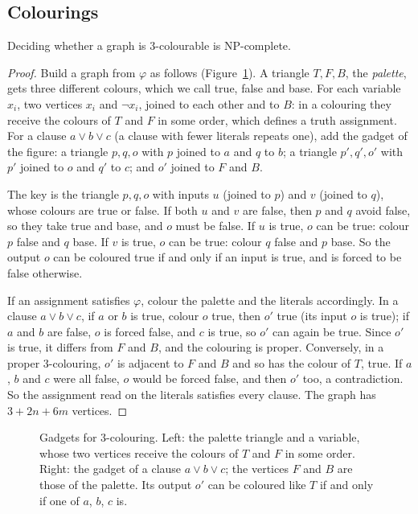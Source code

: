 \subsection*{Colourings}

\begin{theorem}\label{thm:threecol}
Deciding whether a graph is $3$-colourable is NP-complete.
\end{theorem}

\begin{proof}
Build a graph from $\varphi$ as follows (Figure~\ref{fig:colouring}). A triangle $T,F,B$, the \emph{palette}, gets three different colours, which we call true, false and base. For each variable $x_i$, two vertices $x_i$ and $\neg x_i$, joined to each other and to $B$: in a colouring they receive the colours of $T$ and $F$ in some order, which defines a truth assignment. For a clause $a\lor b\lor c$ (a clause with fewer literals repeats one), add the gadget of the figure: a triangle $p,q,o$ with $p$ joined to $a$ and $q$ to $b$; a triangle $p',q',o'$ with $p'$ joined to $o$ and $q'$ to $c$; and $o'$ joined to $F$ and $B$.

The key is the triangle $p,q,o$ with inputs $u$ (joined to $p$) and $v$ (joined to $q$), whose colours are true or false. If both $u$ and $v$ are false, then $p$ and $q$ avoid false, so they take true and base, and $o$ must be false. If $u$ is true, $o$ can be true: colour $p$ false and $q$ base. If $v$ is true, $o$ can be true: colour $q$ false and $p$ base. So the output $o$ can be coloured true if and only if an input is true, and is forced to be false otherwise.

If an assignment satisfies $\varphi$, colour the palette and the literals accordingly. In a clause $a\lor b\lor c$, if $a$ or $b$ is true, colour $o$ true, then $o'$ true (its input $o$ is true); if $a$ and $b$ are false, $o$ is forced false, and $c$ is true, so $o'$ can again be true. Since $o'$ is true, it differs from $F$ and $B$, and the colouring is proper. Conversely, in a proper $3$-colouring, $o'$ is adjacent to $F$ and $B$ and so has the colour of $T$, true. If $a$, $b$ and $c$ were all false, $o$ would be forced false, and then $o'$ too, a contradiction. So the assignment read on the literals satisfies every clause. The graph has $3+2n+6m$ vertices.
\end{proof}

\begin{figure}[ht]
\centering
{}
\caption{Gadgets for $3$-colouring. Left: the palette triangle and a variable, whose two vertices receive the colours of $T$ and $F$ in some order. Right: the gadget of a clause $a\lor b\lor c$; the vertices $F$ and $B$ are those of the palette. Its output $o'$ can be coloured like $T$ if and only if one of $a$, $b$, $c$ is.}
\label{fig:colouring}
\end{figure}

